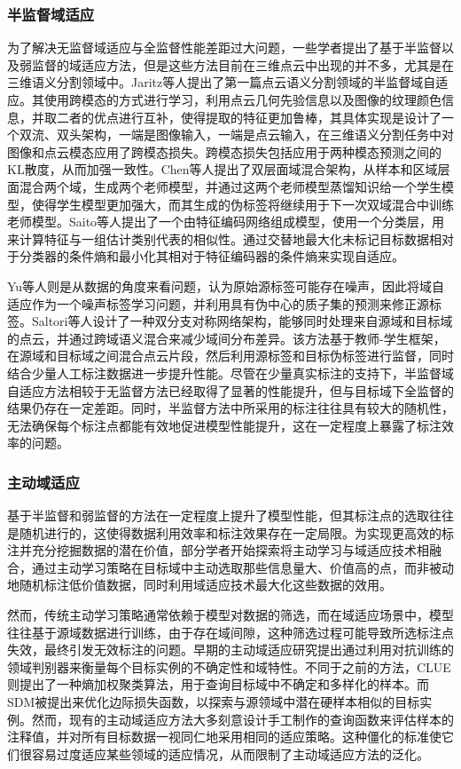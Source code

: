 \subsubsection{半监督域适应}
为了解决无监督域适应与全监督性能差距过大问题，一些学者提出了基于半监督以及弱监督的域适应方法，但是这些方法目前在三维点云中出现的并不多，尤其是在三维语义分割领域中。Jaritz等人提出了第一篇点云语义分割领域的半监督域自适应。其使用跨模态的方式进行学习，利用点云几何先验信息以及图像的纹理颜色信息，并取二者的优点进行互补，使得提取的特征更加鲁棒，其具体实现是设计了一个双流、双头架构，一端是图像输入，一端是点云输入，在三维语义分割任务中对图像和点云模态应用了跨模态损失。跨模态损失包括应用于两种模态预测之间的KL散度，从而加强一致性。Chen等人提出了双层面域混合架构，从样本和区域层面混合两个域，生成两个老师模型，并通过这两个老师模型蒸馏知识给一个学生模型，使得学生模型更加强大，而其生成的伪标签将继续用于下一次双域混合中训练老师模型。Saito等人提出了一个由特征编码网络组成模型，使用一个分类层，用来计算特征与一组估计类别代表的相似性。通过交替地最大化未标记目标数据相对于分类器的条件熵和最小化其相对于特征编码器的条件熵来实现自适应。

Yu等人则是从数据的角度来看问题，认为原始源标签可能存在噪声，因此将域自适应作为一个噪声标签学习问题，并利用具有伪中心的质子集的预测来修正源标签。Saltori等人设计了一种双分支对称网络架构，能够同时处理来自源域和目标域的点云，并通过跨域语义混合来减少域间分布差异。该方法基于教师-学生框架，在源域和目标域之间混合点云片段，然后利用源标签和目标伪标签进行监督，同时结合少量人工标注数据进一步提升性能。尽管在少量真实标注的支持下，半监督域自适应方法相较于无监督方法已经取得了显著的性能提升，但与目标域下全监督的结果仍存在一定差距。同时，半监督方法中所采用的标注往往具有较大的随机性，无法确保每个标注点都能有效地促进模型性能提升，这在一定程度上暴露了标注效率的问题。
\subsubsection{主动域适应}
基于半监督和弱监督的方法在一定程度上提升了模型性能，但其标注点的选取往往是随机进行的，这使得数据利用效率和标注效果存在一定局限。为实现更高效的标注并充分挖掘数据的潜在价值，部分学者开始探索将主动学习与域适应技术相融合，通过主动学习策略在目标域中主动选取那些信息量大、价值高的点，而非被动地随机标注低价值数据，同时利用域适应技术最大化这些数据的效用。

然而，传统主动学习策略通常依赖于模型对数据的筛选，而在域适应场景中，模型往往基于源域数据进行训练，由于存在域间隙，这种筛选过程可能导致所选标注点失效，最终引发无效标注的问题。早期的主动域适应研究提出通过利用对抗训练的领域判别器来衡量每个目标实例的不确定性和域特性。不同于之前的方法，CLUE则提出了一种熵加权聚类算法，用于查询目标域中不确定和多样化的样本。而SDM被提出来优化边际损失函数，以探索与源领域中潜在硬样本相似的目标实例。然而，现有的主动域适应方法大多刻意设计手工制作的查询函数来评估样本的注释值，并对所有目标数据一视同仁地采用相同的适应策略。这种僵化的标准使它们很容易过度适应某些领域的适应情况，从而限制了主动域适应方法的泛化。

